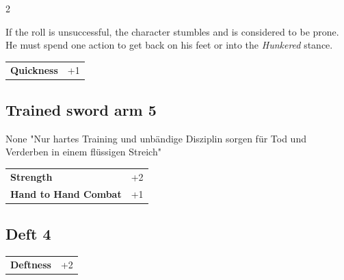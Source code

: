\begin{multicols}{2}
\begin{tcolorbox}
If the roll is unsuccessful, the character stumbles and is considered to be prone. He must spend one action to get back on his feet or into the \textit{Hunkered} stance.


\vspace{3mm}

\begin{tabular}{@{}ll@{}}
    \textbf{Quickness} & +1\\
\end{tabular}


\end{tcolorbox}

\begin{tcolorbox}
    \subsection*{Trained sword arm \hfill \small{5 }}
    \tcblower


\begin{pquote}{None}
"Nur hartes Training und unbändige Disziplin sorgen für Tod und Verderben in einem flüssigen Streich"
\end{pquote}

\vspace{3mm}

\begin{tabular}{@{}ll@{}}
    \textbf{Strength} & +2\\
    \textbf{Hand to Hand Combat} & +1\\
\end{tabular}


\end{tcolorbox}

\begin{tcolorbox}
    \subsection*{Deft \hfill \small{4 }}
    \tcblower




\begin{tabular}{@{}ll@{}}
    \textbf{Deftness} & +2\\
\end{tabular}


\end{tcolorbox}
\end{multicols}
